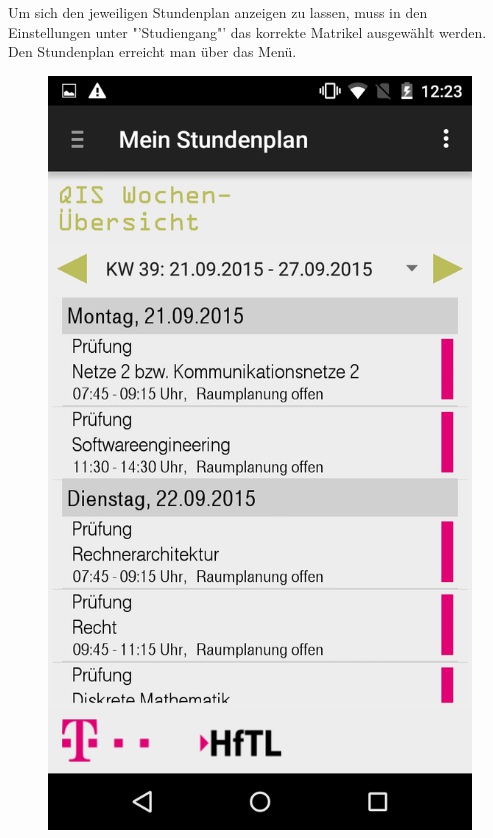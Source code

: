 Um sich den jeweiligen Stundenplan anzeigen zu lassen, muss in den Einstellungen unter "'Studiengang"' das korrekte Matrikel ausgewählt werden.
Den Stundenplan erreicht man über das Menü.

\begin{figure}[h]
	\centering
	\includegraphics[scale=0.35]{03_Bedienungsanleitung/img/stundenplan.png}
\end{figure}

